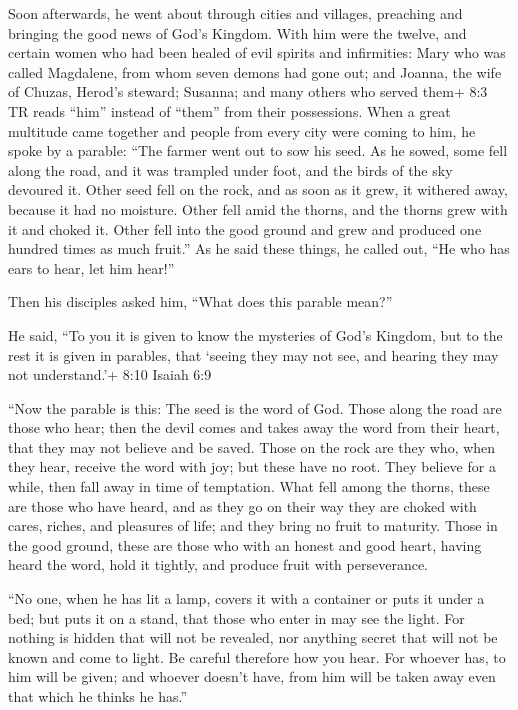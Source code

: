  Soon afterwards, he went about through cities and villages,
preaching and bringing the good news of God's Kingdom. With him were the
twelve,  and certain women who had been healed of evil
spirits and infirmities: Mary who was called Magdalene, from whom seven
demons had gone out;  and Joanna, the wife of Chuzas,
Herod's steward; Susanna; and many others who served them+ 8:3 TR reads
``him'' instead of ``them'' from their possessions.  When a
great multitude came together and people from every city were coming to
him, he spoke by a parable:  ``The farmer went out to sow
his seed. As he sowed, some fell along the road, and it was trampled
under foot, and the birds of the sky devoured it.  Other
seed fell on the rock, and as soon as it grew, it withered away, because
it had no moisture.  Other fell amid the thorns, and the
thorns grew with it and choked it.  Other fell into the good
ground and grew and produced one hundred times as much fruit.'' As he
said these things, he called out, ``He who has ears to hear, let him
hear!''

 Then his disciples asked him, ``What does this parable
mean?''

 He said, ``To you it is given to know the mysteries of
God's Kingdom, but to the rest it is given in parables, that `seeing
they may not see, and hearing they may not understand.'+ 8:10 Isaiah 6:9

 ``Now the parable is this: The seed is the word of God.
 Those along the road are those who hear; then the devil
comes and takes away the word from their heart, that they may not
believe and be saved.  Those on the rock are they who, when
they hear, receive the word with joy; but these have no root. They
believe for a while, then fall away in time of temptation. 
What fell among the thorns, these are those who have heard, and as they
go on their way they are choked with cares, riches, and pleasures of
life; and they bring no fruit to maturity.  Those in the
good ground, these are those who with an honest and good heart, having
heard the word, hold it tightly, and produce fruit with perseverance.

 ``No one, when he has lit a lamp, covers it with a
container or puts it under a bed; but puts it on a stand, that those who
enter in may see the light.  For nothing is hidden that
will not be revealed, nor anything secret that will not be known and
come to light.  Be careful therefore how you hear. For
whoever has, to him will be given; and whoever doesn't have, from him
will be taken away even that which he thinks he has.''

